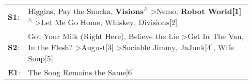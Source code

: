 \begin{supertabular}{p{0.03\textwidth}p{0.92\textwidth}}
 \textbf{S1}:  &                                        Higgins\textsuperscript{}, \enspace Pay the Snucka\textsuperscript{}, \enspace \textbf{Visions\textsuperscript{$\wedge$}} \textgreater \enspace Nemo\textsuperscript{}, \enspace \textbf{Robot World[1]\textsuperscript{$\wedge$}} \textgreater \enspace Let Me Go Home, Whiskey\textsuperscript{}, \enspace Divisions[2]\textsuperscript{}  \enspace  \\
 \textbf{S2}:  &  Got Your Milk (Right Here)\textsuperscript{}, \enspace Believe the Lie\textsuperscript{} \textgreater \enspace Get In The Van\textsuperscript{}, \enspace In the Flesh?\textsuperscript{} \textgreater \enspace August[3]\textsuperscript{} \textgreater \enspace Sociable Jimmy\textsuperscript{}, \enspace JaJunk[4]\textsuperscript{}, \enspace Wife Soup[5]\textsuperscript{}  \enspace  \\
 \textbf{E1}:  &                                                                                                                                                                                                                                                                                                                                     The Song Remains the Same[6]\textsuperscript{}  \enspace  \\
\end{supertabular}
